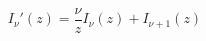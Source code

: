 \documentclass[12pt]{article}
\begin{document}
\begin{displaymath}
I_\nu'(z) = \frac{\nu}{z}I_\nu(z) + I_{\nu+1}(z)
\end{displaymath}
\end{document}
